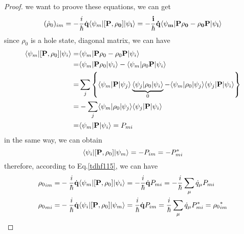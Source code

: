   \begin{proof}
    we want to proove these equations, we can get 
    \begin{equation}
        (\dot{\rho}_0)_{im} = -\frac{i}{\hbar}\dot{{\bf{q}}}\langle \psi_m | [\bf{P}, \rho_0] | \psi_i \rangle= -\frac{i}{\hbar}\dot{{\bf{q}}}\langle \psi_m | {\bf{P}\rho_0 - \rho_0{\bf{P}}} | \psi_i \rangle  \label{tdhf122}
    \end{equation}
    since $\rho_0$ is a hole state, diagonal matrix, we can have
    \begin{equation}
      \begin{aligned}
        \langle \psi_m | [{{\bf{P}}}, \rho_0] | \psi_i \rangle =&  \langle \psi_m | {\bf{P}}\rho_0 - \rho_0{\bf{P}} | \psi_i \rangle \\ \label{tdhf123}
        =& \langle \psi_m | {\bf{P}}\rho_0 | \psi_i \rangle - \langle \psi_m |\rho_0{\bf{P}} | \psi_i \rangle \\
        =& \sum_j \left\{\langle \psi_m | {\bf{P}}| \psi_{j} \rangle \underbrace{\langle \psi_j | \rho_0 | \psi_i \rangle}_{0}- \langle \psi_m | \rho_0 | \psi_{j} \rangle \langle \psi_j |{\bf{P}} | \psi_i \rangle\right\} \\
        =& -\sum_j  \langle \psi_m | \rho_0 | \psi_{j} \rangle \langle \psi_j |{\bf{P}} | \psi_i \rangle \\
        =& \langle \psi_m |{\bf{P}} | \psi_i \rangle = P_{mi}
      \end{aligned}
    \end{equation}  
    in the same way, we can obtain
    \begin{equation}
      	\langle \psi_i | [{\bf{P}}, \rho_0] | \psi_m \rangle = -P_{im} = -P_{mi}^* \label{tdhf124}
    \end{equation}
    therefore, according to Eq.\eqref{tdhf115}, we can have
    \begin{equation}
      \begin{aligned}
        {\rho_0}_{im} =& -\frac{i}{\hbar}{\dot{\bf{q}}}\langle \psi_m | [{\bf{P}}, \rho_0] | \psi_i \rangle = -\frac{i}{\hbar}{\dot{\bf{q}}}P_{mi} = -\frac{i}{\hbar}\sum_{\mu}\dot{q}_{\mu}P_{mi} \\	\label{tdhf125}
        {\rho_0}_{mi} =& -\frac{i}{\hbar}{\dot{\bf{q}}}\langle \psi_i | [{\bf{P}}, \rho_0] | \psi_m \rangle = \frac{i}{\hbar}{\dot{\bf{q}}}P_{im} = \frac{i}{\hbar}\sum_{\mu}{\dot{q}_\mu}P_{mi}^* = {\rho_0}_{im}^*
      \end{aligned}
    \end{equation}

\end{proof}
